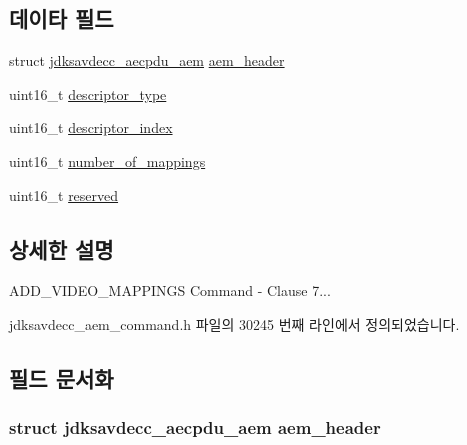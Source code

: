 \subsection*{데이타 필드}
\begin{DoxyCompactItemize}
\item 
struct \hyperlink{structjdksavdecc__aecpdu__aem}{jdksavdecc\+\_\+aecpdu\+\_\+aem} \hyperlink{structjdksavdecc__aem__command__add__video__mappings_ae1e77ccb75ff5021ad923221eab38294}{aem\+\_\+header}
\item 
uint16\+\_\+t \hyperlink{structjdksavdecc__aem__command__add__video__mappings_ab7c32b6c7131c13d4ea3b7ee2f09b78d}{descriptor\+\_\+type}
\item 
uint16\+\_\+t \hyperlink{structjdksavdecc__aem__command__add__video__mappings_a042bbc76d835b82d27c1932431ee38d4}{descriptor\+\_\+index}
\item 
uint16\+\_\+t \hyperlink{structjdksavdecc__aem__command__add__video__mappings_ac7db472c5622ef473d5d0a5c416d5531}{number\+\_\+of\+\_\+mappings}
\item 
uint16\+\_\+t \hyperlink{structjdksavdecc__aem__command__add__video__mappings_a5a6ed8c04a3db86066924b1a1bf4dad3}{reserved}
\end{DoxyCompactItemize}


\subsection{상세한 설명}
A\+D\+D\+\_\+\+V\+I\+D\+E\+O\+\_\+\+M\+A\+P\+P\+I\+N\+GS Command -\/ Clause 7... 

jdksavdecc\+\_\+aem\+\_\+command.\+h 파일의 30245 번째 라인에서 정의되었습니다.



\subsection{필드 문서화}
\subsubsection[{\texorpdfstring{aem\+\_\+header}{aem_header}}]{\setlength{\rightskip}{0pt plus 5cm}struct {\bf jdksavdecc\+\_\+aecpdu\+\_\+aem} aem\+\_\+header}\hypertarget{structjdksavdecc__aem__command__add__video__mappings_ae1e77ccb75ff5021ad923221eab38294}{}\label{structjdksavdecc__aem__command__add__video__mappings_ae1e77ccb75ff5021ad923221eab38294}



